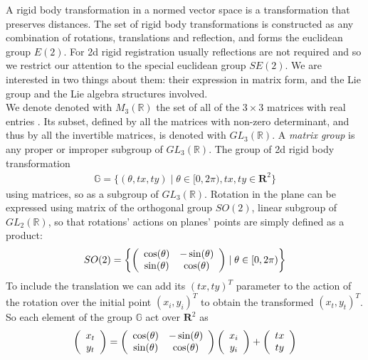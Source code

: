 A rigid body transformation in a normed vector space is a transformation that preserves distances. The set of rigid body transformations is constructed as any combination of rotations, translations and reflection, and forms the euclidean group $E(2)$. For 2d rigid registration usually reflections are not required and so we restrict our attention to the special euclidean group $SE(2)$.  We are interested in two things about them: their expression in matrix form, and the Lie group and the Lie algebra structures involved. \\
We denote denoted with $M_{3}(\mathbb{R})$ the set of all of the $3\times 3$ matrices with real entries . 
Its subset, defined by all the matrices with non-zero determinant, and thus by all the invertible matrices, is denoted with $GL_3 (\mathbb{R})$. A \emph{matrix group} is any proper or improper subgroup of  $GL_3 (\mathbb{R})$.
The group of 2d rigid body transformation 
\begin{align*}
\mathbb{G} =
\{ (\theta, tx, ty) \mid \theta \in [0, 2\pi),   tx, ty \in\mathbf{R}^2  \}
\end{align*}
using matrices, so as a subgroup of $GL_3 (\mathbb{R})$.
Rotation in the plane can be expressed using matrix of the orthogonal group $SO(2)$, linear subgroup of $GL_2 (\mathbb{R})$, so that rotations' actions on planes' points are simply defined as a product: 
\begin{align*}
SO(2) = 
\left \{
\left (
\begin{array} {c c }
\cos(\theta) & - \sin(\theta) \\
\sin(\theta) & \cos(\theta) 
\end{array}
\right )
\mid
\theta \in  [0, 2\pi)
\right \}
\end{align*}
To include the translation we can add its $(tx, ty)^{T}$ parameter to the action of the rotation over the initial point $(x_{i}, y_{i})^{T}$ to obtain the transformed $(x_{t}, y_{t})^{T}$. So each element of the group $\mathbb{G}$ act over $\mathbf{R}^2$ as
\begin{align*}
\left (  
\begin{array} {c }
x_{t} \\
y_{t}
\end{array}
\right ) 
= 
\left (
\begin{array} {c c }
\cos(\theta) & - \sin(\theta) \\
\sin(\theta) & \cos(\theta) 
\end{array}
\right )
\left (  
\begin{array} {c }
x_{i} \\
y_{i}
\end{array}
\right ) 
+
\left (  
\begin{array} {c }
tx \\
ty
\end{array}
\right ) 
\end{align*}
